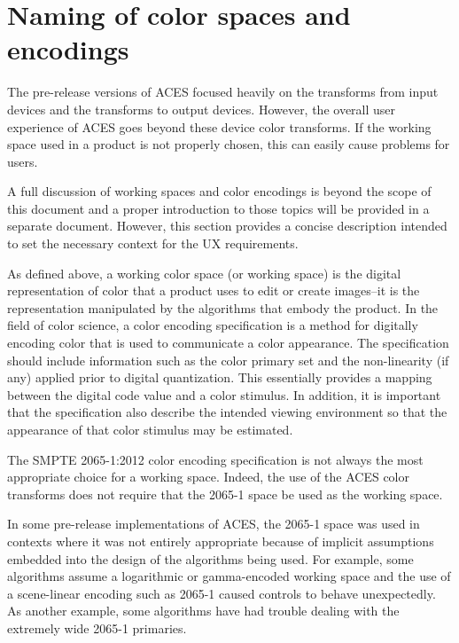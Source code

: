 \numberedformat
\chapter{Naming of color spaces and encodings}

The pre-release versions of ACES focused heavily on the transforms from input devices and the transforms to output devices. However, the overall user experience of ACES goes beyond these device color transforms. If the working space used in a product is not properly chosen, this can easily cause problems for users.

A full discussion of working spaces and color encodings is beyond the scope of this document and a proper introduction to those topics will be provided in a separate document. However, this section provides a concise description intended to set the necessary context for the UX requirements.

As defined above, a working color space (or working space) is the digital representation of color that a product uses to edit or create images--it is the representation manipulated by the algorithms that embody the product. In the field of color science, a color encoding specification is a method for digitally encoding color that is used to communicate a color appearance. The specification should include information such as the color primary set and the non-linearity (if any) applied prior to digital quantization. This essentially provides a mapping between the digital code value and a color stimulus. In addition, it is important that the specification also describe the intended viewing environment so that the appearance of that color stimulus may be estimated.

The SMPTE 2065-1:2012 color encoding specification is not always the most appropriate choice for a working space. Indeed, the use of the ACES color transforms does not require that the 2065-1 space be used as the working space.

In some pre-release implementations of ACES, the 2065-1 space was used in contexts where it was not entirely appropriate because of implicit assumptions embedded into the design of the algorithms being used. For example, some algorithms assume a logarithmic or gamma-encoded working space and the use of a scene-linear encoding such as 2065-1 caused controls to behave unexpectedly. As another example, some algorithms have had trouble dealing with the extremely wide 2065-1 primaries.


